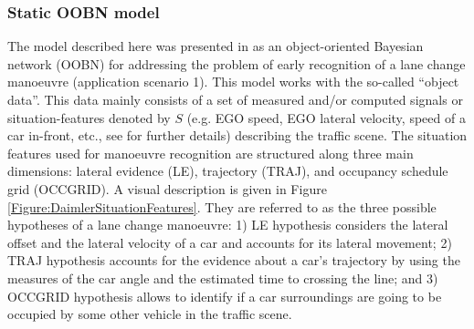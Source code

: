 \subsubsection*{Static OOBN model}

The model described here was presented in \cite{kasper2012object} as an object-oriented Bayesian network (OOBN) \cite{KollerPfeffer1997} for addressing the problem of early recognition of a lane change manoeuvre (application scenario 1).  This model works with the so-called ``object data''. This data mainly consists of a set of measured and/or computed signals or situation-features denoted by $S$ (e.g. EGO speed, EGO lateral velocity, speed of a car in-front, etc., see \cite{kasper2012object} for further details) describing the traffic scene. The situation features used for manoeuvre recognition are structured along three main dimensions: lateral evidence (LE), trajectory (TRAJ), and occupancy schedule grid (OCCGRID).  A visual description is given in Figure \ref{Figure:DaimlerSituationFeatures}. They are referred to as the three possible hypotheses of a lane change manoeuvre: 1) LE hypothesis considers the lateral offset and the lateral velocity of a car and accounts for its lateral movement; 2) TRAJ hypothesis accounts for the evidence about a car's trajectory by using the measures of the car angle and the estimated time to crossing the line; and 3) OCCGRID hypothesis allows to identify if a car surroundings are going to be occupied by some other vehicle in the traffic scene. 

